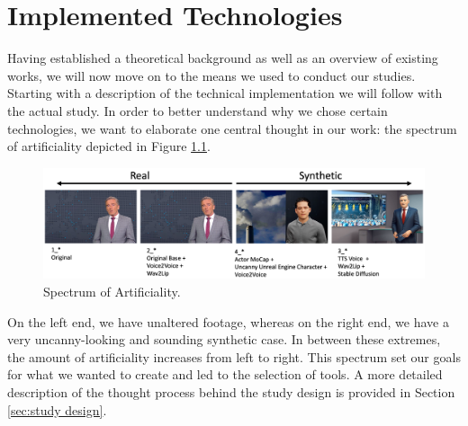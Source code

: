 \documentclass[
  a4paper,  %
  twoside,  %
  bibliography=totoc,
  headsepline,
  cleardoublepage=empty,
  parskip=half,
  draft=false
]{scrbook}
\begin{document}
\chapter{Implemented Technologies}
\label{chap:implementation}
Having established a theoretical background as well as an overview of existing works, we will now move on to the means we used to conduct our studies. Starting with a description of the technical implementation we will follow with the actual study. In order to better understand why we chose certain technologies, we want to elaborate one central thought in our work: the spectrum of artificiality depicted in Figure \ref{fig:spectrum}.

\begin{figure}[h]
  \centering
  \includegraphics[width=1\textwidth]{./graphics/spectrum-art.png}
  \caption{Spectrum of Artificiality.}
  \label{fig:spectrum}
\end{figure}

On the left end, we have unaltered footage, whereas on the right end, we have a very uncanny-looking and sounding synthetic case. In between these extremes, the amount of artificiality increases from left to right. This spectrum set our goals for what we wanted to create and led to the selection of tools. A more detailed description of the thought process behind the study design is provided in Section \ref{sec:study design}.
\end{document}
